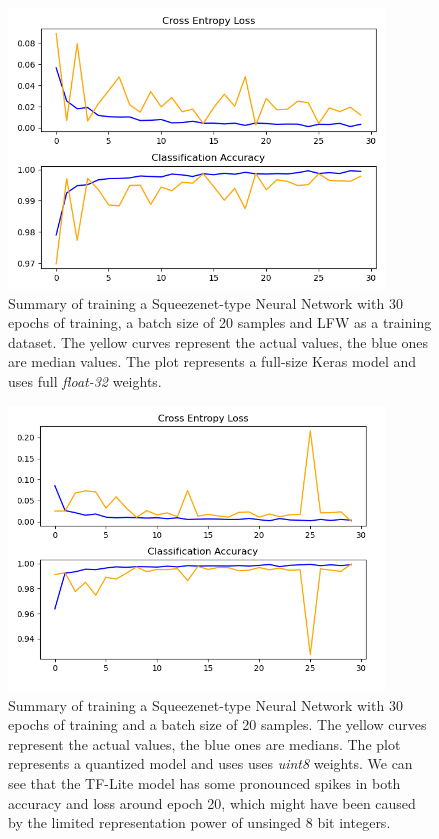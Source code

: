 \begin{figure}
    \centering
    \includegraphics[width = 10cm]{images/squeezenet_30ep_10bat_lfw_full.png}
    \caption{Summary of training a Squeezenet-type Neural Network with 30 epochs of training, a batch size of 20 samples and LFW as a training dataset. The yellow curves represent the actual values, the blue ones are median values. The plot represents a full-size Keras model and uses full \textit{float-32} weights.}
    \label{fig:squeezenet_30ep_10bat_lfw_full}
\end{figure}

\begin{figure}
    \centering
    \includegraphics[width = 10cm]{images/squeezenet_30ep_10bat_lfw_tfl.png}
    \caption{Summary of training a Squeezenet-type Neural Network with 30 epochs of training and a batch size of 20 samples. The yellow curves represent the actual values, the blue ones are medians. The plot represents a quantized model and uses uses \textit{uint8} weights. We can see that the TF-Lite model has some pronounced spikes in both accuracy and loss around epoch 20, which might have been caused by the limited representation power of unsinged 8 bit integers.}
    \label{fig:squeezenet_30ep_10bat_lfw_tfl}
\end{figure}
